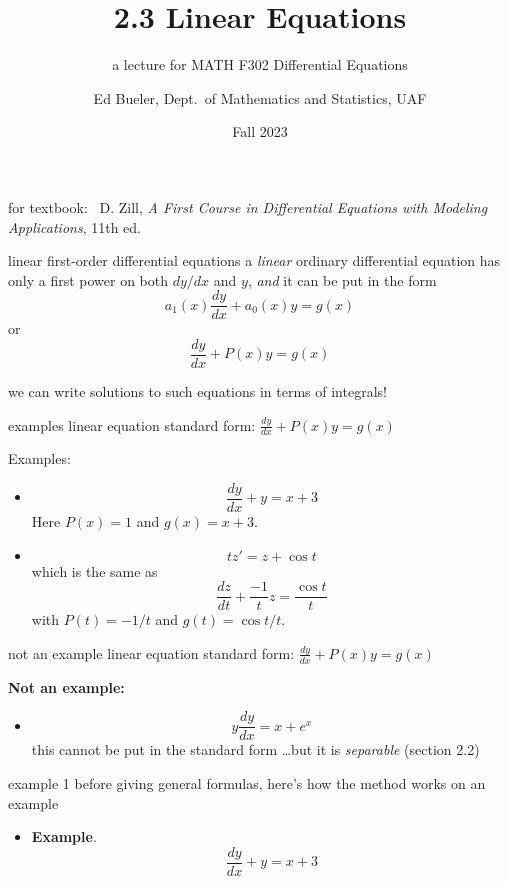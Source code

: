 \documentclass{beamer}
\title{2.3 Linear Equations}
\subtitle{a lecture for MATH F302 Differential Equations}
\author{Ed Bueler, Dept.~of Mathematics and Statistics, UAF}
\date{Fall 2023}
\newcommand{\ds}{\displaystyle}
\begin{document}


\begin{frame}
\titlepage

\centerline{\tiny for textbook: \, D. Zill, \emph{A First Course in Differential Equations with Modeling Applications}, 11th ed.}
\end{frame}


\begin{frame}{linear first-order differential equations}
a \emph{linear} ordinary differential equation has only a first power on both $dy/dx$ and $y$, \emph{and} it can be put in the form
        $$a_1(x) \frac{dy}{dx} + a_0(x) y = g(x)$$
or
        $$\frac{dy}{dx} + P(x) y = g(x)$$

\bigskip
\alert{we can write solutions to such equations in terms of integrals!}
\end{frame}


\begin{frame}{examples}
linear equation standard form: \qquad $\ds \frac{dy}{dx} + P(x) y = g(x)$

\bigskip
Examples:
\begin{itemize}
    \item
        $$\frac{dy}{dx} + y = x+3$$
    Here $P(x)=1$ and $g(x) = x+3$.
    \item
        $$t z' = z + \cos t$$
    which is the same as
        $$\frac{dz}{dt} + \frac{-1}{t} z = \frac{\cos t}{t}$$
    with $P(t) = -1/t$ and $g(t)=\cos t/t$.
\end{itemize}
\end{frame}


\begin{frame}{not an example}
linear equation standard form: \qquad $\ds \frac{dy}{dx} + P(x) y = g(x)$

\bigskip
 \textbf{Not an example:}
 \begin{itemize}
    \item
        $$y \frac{dy}{dx} = x+e^x$$
    this cannot be put in the standard form \dots but it is \emph{separable} (section 2.2)
\end{itemize}
\end{frame}


\begin{frame}{example 1}
before giving general formulas, here's how the method works on an example

\begin{itemize}
    \item \textbf{Example}.
        $$\frac{dy}{dx} + y = x+3$$
\end{itemize}

\vspace{50mm}
\end{frame}
\end{document}
